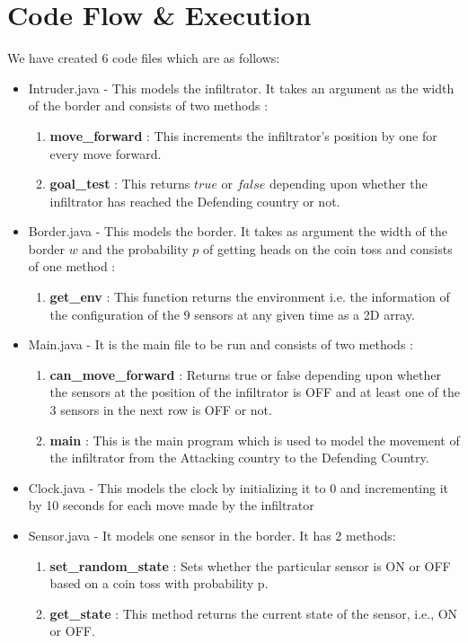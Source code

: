 \documentclass[12pt]{article}
\begin{document}
\section{Code Flow \& Execution}
We have created 6 code files which are as follows:
    \begin{itemize}
        \item Intruder.java - This models the infiltrator. It takes an argument as the width of the border and consists of two methods :
        \begin{enumerate}
            \item \textbf{move\_forward} : This increments the infiltrator's position by one for every move forward.
            \item \textbf{goal\_test} : This returns $true$ or $false$ depending upon whether the infiltrator has reached the Defending country or not.
        \end{enumerate}
        \item Border.java - This models the border. It takes as argument the width of the border $w$ and the probability $p$ of getting heads on the coin toss and consists of one method :
        \begin{enumerate}
            \item \textbf{get\_env} : This function returns the environment i.e. the information of the configuration of the 9 sensors at any given time as a 2D array.
        \end{enumerate} \newpage
        \item Main.java - It is the main file to be run and consists of two methods : \begin{enumerate}
            \item \textbf{can\_move\_forward} : Returns true or false depending upon whether the sensors at the position of the infiltrator is OFF and at least one of the 3 sensors in the next row is OFF or not.
            \item \textbf{main} : This is the main program which is used to model the movement of the infiltrator from the Attacking country to the Defending Country.
        \end{enumerate}
        \item Clock.java - This models the clock by initializing it to 0 and incrementing it by 10 seconds for each move made by the infiltrator

        \item Sensor.java - It models one sensor in the border. It has 2 methods: 
        \begin{enumerate}
            \item \textbf{set\_random\_state} : Sets whether the particular sensor is ON or OFF based on a coin toss with probability p.
            \item \textbf{get\_state} : This method returns the current state of the sensor, i.e., ON or OFF.
        \end{enumerate}
        

\end{itemize}
\end{document}
